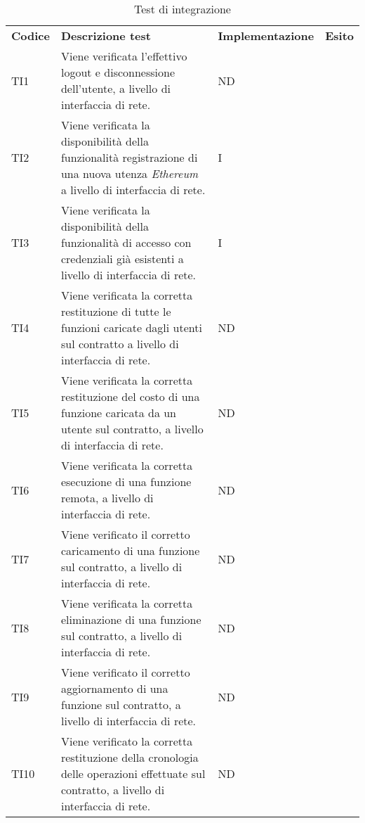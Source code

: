 \begin{longtable}{|C{1.5cm}|C{8cm}|C{3cm}|C{1cm}|}

	\caption{Test di integrazione}\\
	\hline

	\textbf{Codice} & \textbf{Descrizione test}  & \textbf{Implementazione}& \textbf{Esito}
	\tabularnewline
	\endfirsthead
	TI1 &
	Viene verificata l'effettivo logout e disconnessione dell'utente, a livello di interfaccia di rete.  &
	ND \\

	TI2 &
	Viene verificata la disponibilità della funzionalità registrazione di una nuova utenza \textit{Ethereum\glo} a livello di interfaccia di rete.  &
	I \\

	TI3 &
	Viene verificata la disponibilità della funzionalità di accesso con credenziali già esistenti a livello di interfaccia di rete.  &
	I \\

	TI4 &
	Viene verificata la corretta restituzione di tutte le funzioni caricate dagli utenti sul contratto a livello di interfaccia di rete.  &
	ND \\

	TI5 &
	Viene verificata la corretta restituzione del costo di una funzione caricata da un utente sul contratto, a livello di interfaccia di rete.  &
	ND \\

	TI6 &
	Viene verificata la corretta esecuzione di una funzione remota, a livello di interfaccia di rete.  &
	ND \\

	TI7 &
	Viene verificato il corretto caricamento di una funzione sul contratto, a livello di interfaccia di rete.  &
	ND \\

	TI8 &
	Viene verificata la corretta eliminazione di una funzione sul contratto, a livello di interfaccia di rete.  &
	ND \\

	TI9 &
	Viene verificato il corretto aggiornamento di una funzione sul contratto, a livello di interfaccia di rete.  &
	ND \\

	TI10 &
	Viene verificato la corretta restituzione della cronologia delle operazioni effettuate sul contratto, a livello di interfaccia di rete.  &
	ND \\


\end{longtable}
